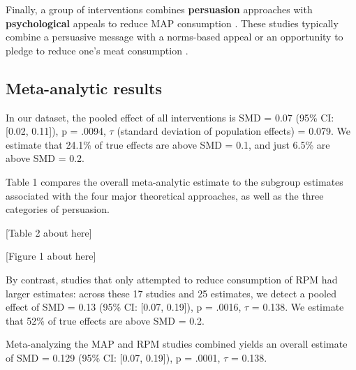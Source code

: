 \documentclass[sn-nature,referee,pdflatex]{sn-jnl}
\begin{document}
\begin{comment}
Norms might be descriptive, stating how many people engaged in the desired behavior [@aldoh2023], or dynamic, telling subjects that the number of people reducing their MAP consumption is increasing over time [@aldoh2023; @coker2022; @sparkman2020].
Another study looked at response inhibition training, where subjects are trained to associate meat with an inhibiting response [@camp2019].
The first psychology study meeting our inclusion criteria was published in 2017.
\end{comment}

Finally, a group of interventions combines \textbf{persuasion}
approaches with \textbf{psychological} appeals to reduce MAP consumption
\citep{berndsen2005, bertolaso2015, carfora2023, fehrenbach2015, hennessy2016, mathur2021effectiveness, mattson2020, piester2020, shreedhar2021}.
These studies typically combine a persuasive message with a norms-based
appeal \citep{piester2020, mattson2020} or an opportunity to pledge to
reduce one's meat consumption
\citep{mathur2021effectiveness, shreedhar2021}.

\subsection{Meta-analytic results}\label{sec2.3}

In our dataset, the pooled effect of all interventions is SMD = 0.07
(95\% CI: {[}0.02, 0.11{]}), p = .0094, \(\tau\) (standard deviation of
population effects) = 0.079. We estimate that 24.1\% of true effects are
above SMD = 0.1, and just 6.5\% are above SMD = 0.2.

Table 1 compares the overall meta-analytic estimate to the subgroup
estimates associated with the four major theoretical approaches, as well
as the three categories of persuasion.

\begin{center}
[Table 2 about here]
\end{center}
\begin{center}
[Figure 1 about here]
\end{center}

By contrast, studies that only attempted to reduce consumption of RPM
had larger estimates: across these 17 studies and 25 estimates, we
detect a pooled effect of SMD = 0.13 (95\% CI: {[}0.07, 0.19{]}), p =
.0016, \(\tau\) = 0.138. We estimate that 52\% of true effects are above
SMD = 0.2.

Meta-analyzing the MAP and RPM studies combined yields an overall
estimate of SMD = 0.129 (95\% CI: {[}0.07, 0.19{]}), p = .0001, \(\tau\)
= 0.138.
\end{document}
